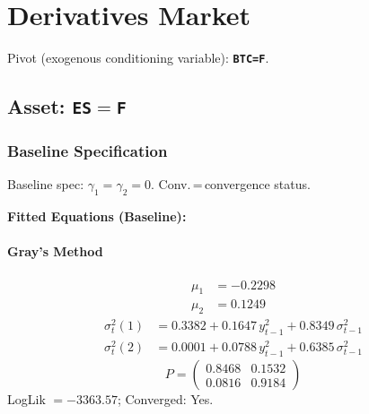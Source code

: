 \documentclass[11pt, a4paper]{article}
\begin{document}
\clearpage
\section{Derivatives Market}
\noindent Pivot (exogenous conditioning variable): \textbf{\texttt{BTC=F}}.

\subsection{Asset: \texttt{ES$=$F}}
\subsubsection*{Baseline Specification}
\begin{table}[H]
\centering\scriptsize
\caption{ES$=$F --- Baseline Specification}
\label{tab:esf_baseline}
\smallskip
\begin{flushleft}\scriptsize Baseline spec: $\gamma_1 = \gamma_2 = 0$. Conv.\,=\,convergence status.\end{flushleft}
\end{table}

\medskip
\noindent\textbf{Fitted Equations (Baseline):}
\paragraph{Gray's Method}
\begin{align}
\mu_{1} &= -0.2298 \\
\mu_{2} &= 0.1249
\end{align}
\begin{align}
\sigma^2_{t}(1) &= 0.3382 + 0.1647\, y_{t-1}^2 + 0.8349\, \sigma^2_{t-1} \\
\sigma^2_{t}(2) &= 0.0001 + 0.0788\, y_{t-1}^2 + 0.6385\, \sigma^2_{t-1}
\end{align}
\begin{equation}
P = \begin{pmatrix} 0.8468 & 0.1532 \\ 0.0816 & 0.9184 \end{pmatrix}
\end{equation}
LogLik $= -3363.57$; Converged: Yes.
\end{document}
